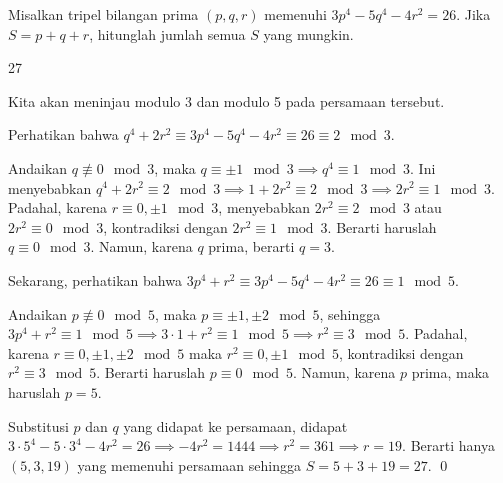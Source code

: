 \documentclass[12pt]{scrartcl}
\begin{document}
	\begin{soalbaru}
		Misalkan tripel bilangan prima $(p,q,r)$ memenuhi $3p^4-5q^4-4r^2=26$. Jika $S = p+q+r$, hitunglah jumlah semua $S$ yang mungkin.
		
		\begin{jawaban}
		27
		\end{jawaban}
		\begin{solusi}
		Kita akan meninjau modulo 3 dan modulo 5 pada persamaan tersebut. 
		
		Perhatikan bahwa $q^4+2r^2 \equiv 3p^4-5q^4-4r^2 \equiv 26 \equiv 2\mod 3$. 
		
		Andaikan $q \not\equiv 0 \mod 3$, maka $q \equiv \pm 1 \mod 3 \implies q^4 \equiv 1 \mod 3$. Ini  menyebabkan $q^4 +2r^2 \equiv 2 \mod 3 \implies 1 + 2r^2 \equiv 2 \mod 3 \implies 2r^2 \equiv 1 \mod 3$. Padahal, karena $r \equiv 0,\pm 1 \mod 3$, menyebabkan $2r^2 \equiv  2 \mod 3$ atau $2r^2 \equiv 0 \mod 3$, kontradiksi dengan $2r^2 \equiv 1 \mod 3$. Berarti haruslah $q \equiv 0 \mod 3$. Namun, karena $q$ prima, berarti $q=3$.
		
		Sekarang, perhatikan bahwa $3p^4+r^2 \equiv 3p^4-5q^4-4r^2 \equiv 26 \equiv 1 \mod 5$.
		
		Andaikan $p \not \equiv 0 \mod 5$, maka $p \equiv \pm1,\pm2 \mod 5$, sehingga $3p^4+r^2 \equiv 1 \mod 5 \implies 3\cdot1+r^2 \equiv 1 \mod 5 \implies r^2 \equiv 3 \mod 5$. Padahal, karena $r \equiv 0,\pm1,\pm2 \mod 5$ maka $r^2 \equiv 0,\pm1 \mod 5$, kontradiksi dengan $r^2 \equiv 3 \mod 5$. Berarti haruslah $p \equiv 0 \mod 5$. Namun, karena $p$ prima, maka haruslah $p=5$.
		
		Substitusi $p$ dan $q$ yang didapat ke persamaan, didapat $3\cdot 5^4 - 5 \cdot 3^4 - 4r^2 = 26 \implies -4r^2 = 1444 \implies r^2 = 361 \implies r = 19$. Berarti hanya $(5,3,19)$ yang memenuhi persamaan sehingga $S=5+3+19=27$. \qed
		\end{solusi}
	\end{soalbaru}
	
\end{document}
